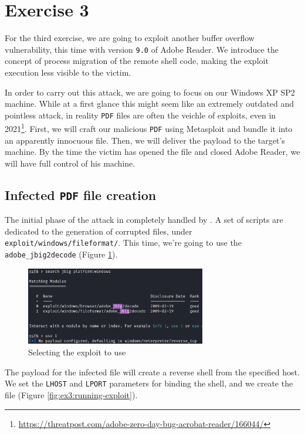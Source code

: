 \section{Exercise 3}
\label{sec:ex3}
For the third exercise, we are going to exploit another buffer overflow vulnerability, this time with version \texttt{9.0} of Adobe Reader. We introduce the concept of process migration of the remote shell code, making the exploit execution less visible to the victim.

In order to carry out this attack, we are going to focus on our Windows XP SP2 machine. While at a first glance this might seem like an extremely outdated and pointless attack, in reality \texttt{PDF} files are often the veichle of exploits, even in 2021\footnote{\url{https://threatpost.com/adobe-zero-day-bug-acrobat-reader/166044/}}. First, we will craft our malicious \texttt{PDF} using Metasploit and bundle it into an apparently innocuous file. Then, we will deliver the payload to the target's machine. By the time the victim has opened the file and closed Adobe Reader, we will have full control of his machine.

\subsection{Infected \texttt{PDF} file creation}
\label{subsec:ex3:infected-pdf-file-creation}
The initial phase of the attack in completely handled by . A set of  scripts are dedicated to the generation of corrupted files, under \texttt{exploit/windows/fileformat/}. This time, we're going to use the \texttt{adobe\_jbig2decode} (Figure \ref{fig:ex3:selecting-exploit}).

\begin{figure}[htbp]
    \centering
    \includegraphics[width=0.7\textwidth]{../drawable/exercise_3_screenshots/module_selection.png}
    \caption{Selecting the exploit to use}
    \label{fig:ex3:selecting-exploit}
\end{figure}

The payload for the infected file will create a reverse shell from the specified host. We set the \texttt{LHOST} and \texttt{LPORT} parameters for binding the shell, and we create the file (Figure \ref{fig:ex3:running-exploit}).

